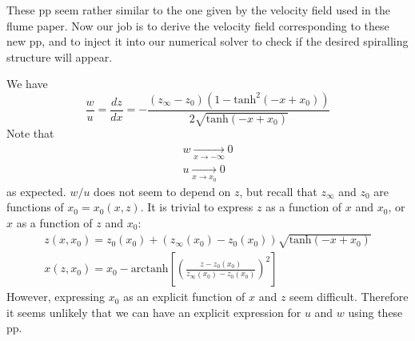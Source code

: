 \documentclass[11pt]{article}
\begin{document}
These pp seem rather similar to the one given by the velocity field used in the flume paper.
Now our job is to derive the velocity field corresponding to these new pp, and to inject it into our numerical solver to check if the desired spiralling structure will appear.

We have
\[
\frac{w}{u} = \frac{dz}{dx} = -\frac{(z_\infty - z_0)\left(1-\text{tanh}^2(-x+x_0)\right)}
		{2\sqrt{\text{tanh}(-x+x_0)}}
\]
Note that 
\[
\begin{matrix}
w  \xrightarrow[x \rightarrow -\infty]{} 0 \\
u  \xrightarrow[x \rightarrow x_0]{} 0
\end{matrix}
\]
as expected.
$w/u$ does not seem to depend on $z$, but recall that $z_\infty$ and $z_0$ are functions of $x_0 = x_0(x,z)$.
It is trivial to express $z$ as a function of $x$ and $x_0$, or $x$ as a function of $z$ and $x_0$:
\[
\begin{matrix}
z(x, x_0) = z_0(x_0) + (z_\infty(x_0) - z_0(x_0)) \sqrt {\text{tanh} (-x + x_0)} \\
x(z, x_0) = x_0 - \text{arctanh} \left[ \left( \frac{z - z_0(x_0)}{z_\infty(x_0) - z_0(x_0)} \right)^2 \right]
\end{matrix}
\]
However, expressing $x_0$ as an explicit function of $x$ and $z$ seem difficult.
Therefore it seems unlikely that we can have an explicit expression for $u$ and $w$ using these pp.
\end{document}

